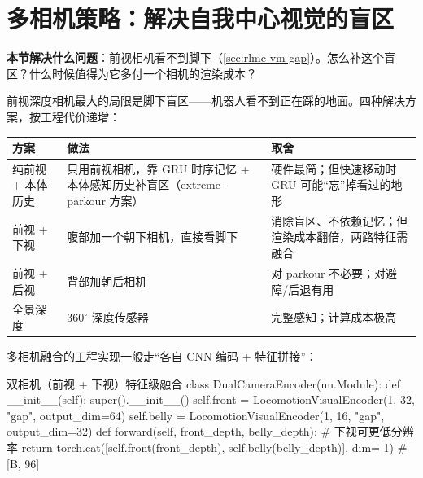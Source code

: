 \begin{practice}
\end{practice}

\section{多相机策略：解决自我中心视觉的盲区}
\label{sec:rlmc-vm-multicam}

\textbf{本节解决什么问题}：前视相机看不到脚下（\cref{sec:rlmc-vm-gap}）。怎么补这个盲区？什么时候值得为它多付一个相机的渲染成本？

前视深度相机最大的局限是脚下盲区——机器人看不到正在踩的地面。四种解决方案，按工程代价递增：

\begin{center}
\small
\begin{tabular}{@{}p{2.4cm}p{4.6cm}p{4.4cm}@{}}
\toprule
方案 & 做法 & 取舍 \\
\midrule
纯前视 + 本体历史 & 只用前视相机，靠 GRU 时序记忆 + 本体感知历史补盲区（extreme-parkour 方案） & 硬件最简；但快速移动时 GRU 可能“忘”掉看过的地形 \\
前视 + 下视 & 腹部加一个朝下相机，直接看脚下 & 消除盲区、不依赖记忆；但渲染成本翻倍，两路特征需融合 \\
前视 + 后视 & 背部加朝后相机 & 对 parkour 不必要；对避障/后退有用 \\
全景深度 & $360^\circ$ 深度传感器 & 完整感知；计算成本极高 \\
\bottomrule
\end{tabular}
\end{center}

多相机融合的工程实现一般走“各自 CNN 编码 + 特征拼接”：

\begin{codebox}[Python]{双相机（前视 + 下视）特征级融合}
class DualCameraEncoder(nn.Module):
    def __init__(self):
        super().__init__()
        self.front = LocomotionVisualEncoder(1, 32, "gap", output_dim=64)
        self.belly = LocomotionVisualEncoder(1, 16, "gap", output_dim=32)
    def forward(self, front_depth, belly_depth):   # 下视可更低分辨率
        return torch.cat([self.front(front_depth),
                          self.belly(belly_depth)], dim=-1)  # [B, 96]
\end{codebox}

